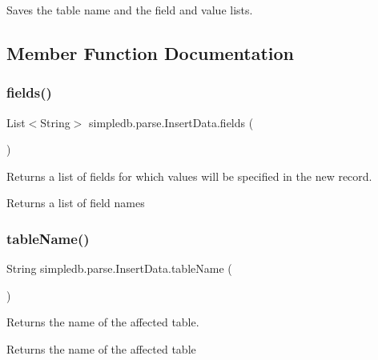 Saves the table name and the field and value lists. 

\subsection{Member Function Documentation}
\mbox{\label{classsimpledb_1_1parse_1_1InsertData_a961e06a30097c81b78a7f6328274c3c3}} 
\subsubsection{\texorpdfstring{fields()}{fields()}}
{\footnotesize\ttfamily List$<$String$>$ simpledb.\+parse.\+Insert\+Data.\+fields (\begin{DoxyParamCaption}{ }\end{DoxyParamCaption})\hspace{0.3cm}{\ttfamily [inline]}}

Returns a list of fields for which values will be specified in the new record. \begin{DoxyReturn}{Returns}
a list of field names 
\end{DoxyReturn}
\mbox{\label{classsimpledb_1_1parse_1_1InsertData_aab0d64b2fe9bf60a34e2341cc515fae9}} 
\subsubsection{\texorpdfstring{table\+Name()}{tableName()}}
{\footnotesize\ttfamily String simpledb.\+parse.\+Insert\+Data.\+table\+Name (\begin{DoxyParamCaption}{ }\end{DoxyParamCaption})\hspace{0.3cm}{\ttfamily [inline]}}

Returns the name of the affected table. \begin{DoxyReturn}{Returns}
the name of the affected table 
\end{DoxyReturn}
\mbox{\label{classsimpledb_1_1parse_1_1InsertData_a9f16fbf1c7a4e544d5cc6f17ca915469}} 
